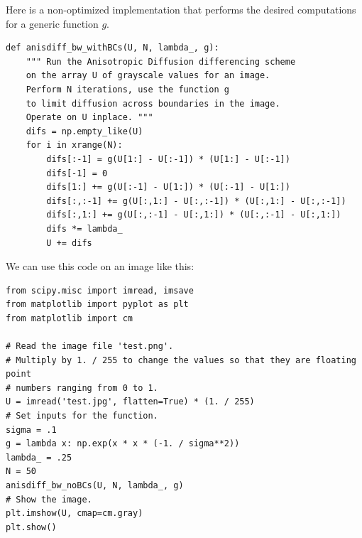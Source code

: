 Here is a non-optimized implementation that performs the desired computations for a generic function $g$.
\begin{lstlisting}
def anisdiff_bw_withBCs(U, N, lambda_, g):
    """ Run the Anisotropic Diffusion differencing scheme
    on the array U of grayscale values for an image.
    Perform N iterations, use the function g
    to limit diffusion across boundaries in the image.
    Operate on U inplace. """
    difs = np.empty_like(U)
    for i in xrange(N):
        difs[:-1] = g(U[1:] - U[:-1]) * (U[1:] - U[:-1])
        difs[-1] = 0
        difs[1:] += g(U[:-1] - U[1:]) * (U[:-1] - U[1:])
        difs[:,:-1] += g(U[:,1:] - U[:,:-1]) * (U[:,1:] - U[:,:-1])
        difs[:,1:] += g(U[:,:-1] - U[:,1:]) * (U[:,:-1] - U[:,1:])
        difs *= lambda_
        U += difs
\end{lstlisting}

We can use this code on an image like this:
\begin{lstlisting}
from scipy.misc import imread, imsave
from matplotlib import pyplot as plt
from matplotlib import cm

# Read the image file 'test.png'.
# Multiply by 1. / 255 to change the values so that they are floating point
# numbers ranging from 0 to 1.
U = imread('test.jpg', flatten=True) * (1. / 255)
# Set inputs for the function.
sigma = .1
g = lambda x: np.exp(x * x * (-1. / sigma**2))
lambda_ = .25
N = 50
anisdiff_bw_noBCs(U, N, lambda_, g)
# Show the image.
plt.imshow(U, cmap=cm.gray)
plt.show()
\end{lstlisting}

